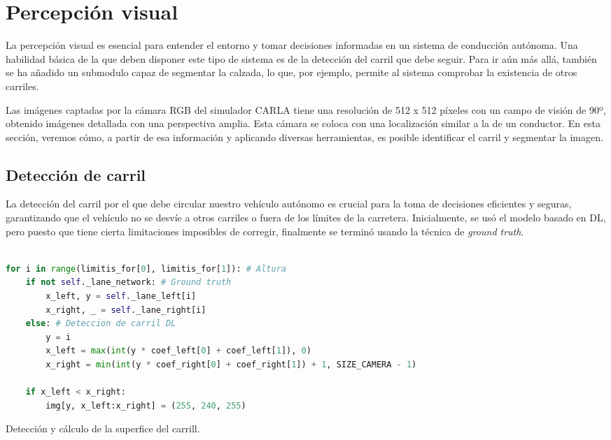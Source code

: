\section{Percepción visual}

La percepción visual es esencial para entender el entorno y tomar decisiones informadas en un sistema de conducción autónoma. Una habilidad básica de la que deben disponer este tipo de sistema es de la detección del carril que debe seguir. Para ir aún más allá, también se ha añadido un submodulo capaz de segmentar la calzada, lo que, por ejemplo, permite al sistema comprobar la existencia de otros carriles.

Las imágenes captadas por la cámara RGB del simulador CARLA tiene una resolución de 512 x 512 píxeles con un campo de visión de 90º, obtenido imágenes detallada con una perspectiva amplia. Esta cámara se coloca con una localización similar a la de un conductor. En esta sección, veremos cómo, a partir de esa información y aplicando diversas herramientas, es posible identificar el carril y segmentar la imagen.

\subsection{Detección de carril}

La detección del carril por el que debe circular nuestro vehículo autónomo es crucial para la toma de decisiones eficientes y seguras, garantizando que el vehículo no se desvíe a otros carriles o fuera de los límites de la carretera. Inicialmente, se usó el modelo basado en \ac{DL}, pero puesto que tiene cierta limitaciones imposibles de corregir, finalmente se terminó usando la técnica de \textit{ground truth}.





\begin{code}[h]
\begin{lstlisting}[language=Python]

for i in range(limitis_for[0], limitis_for[1]): # Altura
	if not self._lane_network: # Ground truth
		x_left, y = self._lane_left[i]
		x_right, _ = self._lane_right[i]
	else: # Deteccion de carril DL
		y = i
		x_left = max(int(y * coef_left[0] + coef_left[1]), 0)
		x_right = min(int(y * coef_right[0] + coef_right[1]) + 1, SIZE_CAMERA - 1)

	if x_left < x_right:
		img[y, x_left:x_right] = (255, 240, 255)
\end{lstlisting}
\caption[Detección y cálculo de la superfice del carril]{Detección y cálculo de la superfice del carrill.}
\label{code:detectar_carril}
\end{code}

